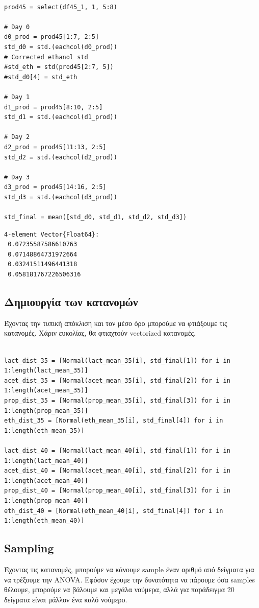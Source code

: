 \documentclass[11pt]{article}
\begin{document}
\begin{verbatim}

prod45 = select(df45_1, 1, 5:8)

# Day 0
d0_prod = prod45[1:7, 2:5]
std_d0 = std.(eachcol(d0_prod))
# Corrected ethanol std
#std_eth = std(prod45[2:7, 5])
#std_d0[4] = std_eth

# Day 1
d1_prod = prod45[8:10, 2:5]
std_d1 = std.(eachcol(d1_prod))

# Day 2
d2_prod = prod45[11:13, 2:5]
std_d2 = std.(eachcol(d2_prod))

# Day 3
d3_prod = prod45[14:16, 2:5]
std_d3 = std.(eachcol(d3_prod))

std_final = mean([std_d0, std_d1, std_d2, std_d3])
\end{verbatim}

\begin{verbatim}
4-element Vector{Float64}:
 0.07235587586610763
 0.07148864731972664
 0.03241511496441318
 0.058181767226506316
\end{verbatim}

\subsection{Δημιουργία των κατανομών}
\label{sec:orgd83374a}
Έχοντας την τυπική απόκλιση και τον μέσο όρο μπορούμε να φτιάξουμε τις κατανομές. Χάριν ευκολίας, θα φτιαχτούν vectorized κατανομές.

\begin{verbatim}

lact_dist_35 = [Normal(lact_mean_35[i], std_final[1]) for i in 1:length(lact_mean_35)]
acet_dist_35 = [Normal(acet_mean_35[i], std_final[2]) for i in 1:length(acet_mean_35)]
prop_dist_35 = [Normal(prop_mean_35[i], std_final[3]) for i in 1:length(prop_mean_35)]
eth_dist_35 = [Normal(eth_mean_35[i], std_final[4]) for i in 1:length(eth_mean_35)]

lact_dist_40 = [Normal(lact_mean_40[i], std_final[1]) for i in 1:length(lact_mean_40)]
acet_dist_40 = [Normal(acet_mean_40[i], std_final[2]) for i in 1:length(acet_mean_40)]
prop_dist_40 = [Normal(prop_mean_40[i], std_final[3]) for i in 1:length(prop_mean_40)]
eth_dist_40 = [Normal(eth_mean_40[i], std_final[4]) for i in 1:length(eth_mean_40)]

\end{verbatim}

\subsection{Sampling}
\label{sec:orgfd008a0}
Έχοντας τις κατανομές, μπορούμε να κάνουμε sample έναν αριθμό από δείγματα για να τρέξουμε την ANOVA. Εφόσον έχουμε την δυνατότητα να πάρουμε όσα samples θέλουμε, μπορούμε να βάλουμε και μεγάλα νούμερα, αλλά για παράδειγμα 20 δείγματα είναι μάλλον ένα καλό νούμερο.
\end{document}
